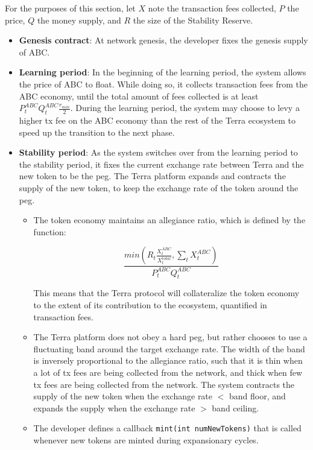 \documentclass{article}
\begin{document}
For the purposes of this section, let $X$ note the transaction fees collected, $P$ the price, $Q$ the money supply, and $R$ the size of the Stability Reserve. 

\begin{itemize}
    \item \textbf{Genesis contract}: At network genesis, the developer fixes the genesis supply of ABC.
    
    \item \textbf{Learning period}: In the beginning of the learning period, the system allows the price of ABC to float. While doing so, it collects transaction fees from the ABC economy, until the total amount of fees collected is at least $ P^{ABC}_{t}Q^{ABC}_{t} \frac{r_{min}}{2}$. During the learning period, the system may choose to levy a higher tx fee on the ABC economy than the rest of the Terra ecosystem to speed up the transition to the next phase.
    
    \item \textbf{Stability period}: As the system switches over from the learning period to the stability period, it fixes the current exchange rate between Terra and the new token to be the peg. The Terra platform expands and contracts the supply of the new token, to keep the exchange rate of the token around the peg. 
    
    \begin{itemize}
        \item The token economy maintains an allegiance ratio, which is defined by the function:  
        
        $$\frac{
            min(R_t \frac{X^{ABC}_t}{X^{total}_t}, \sum_{t} X^{ABC}_t)
        }{
            P^{ABC}_{t}Q^{ABC}_{t}
        }$$
        
        This means that the Terra protocol will collateralize the token economy to the extent of its contribution to the ecosystem, quantified in transaction fees. 
        
        \item The Terra platform does not obey a hard peg, but rather chooses to use a fluctuating band around the target exchange rate. The width of the band is inversely proportional to the allegiance ratio, such that it is thin when a lot of tx fees are being collected from the network, and thick when few tx fees are being collected from the network. The system contracts the supply of the new token when the exchange rate $<$ band floor, and expands the supply when the exchange rate $>$ band ceiling.
        
        \item The developer defines a callback \texttt{mint(int numNewTokens)} that is called whenever new tokens are minted during expansionary cycles.  
        
    \end{itemize}
\end{itemize}
\end{document}
